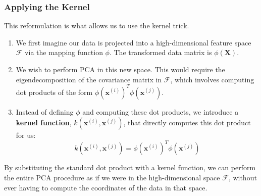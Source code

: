 \begin{enumerate}
\subsubsection*{Applying the Kernel}
This reformulation is what allows us to use the kernel trick.
\begin{enumerate}
    \item We first imagine our data is projected into a high-dimensional feature space $\mathcal{F}$ via the mapping function $\phi$. The transformed data matrix is $\phi(\mathbf{X})$.
    \item We wish to perform PCA in this new space. This would require the eigendecomposition of the covariance matrix in $\mathcal{F}$, which involves computing dot products of the form $\phi(\mathbf{x}^{(i)})^T \phi(\mathbf{x}^{(j)})$.
    \item Instead of defining $\phi$ and computing these dot products, we introduce a \textbf{kernel function}, $k(\mathbf{x}^{(i)}, \mathbf{x}^{(j)})$, that directly computes this dot product for us:
    $$ k(\mathbf{x}^{(i)}, \mathbf{x}^{(j)}) = \phi(\mathbf{x}^{(i)})^T \phi(\mathbf{x}^{(j)}) $$
\end{enumerate}
By substituting the standard dot product with a kernel function, we can perform the entire PCA procedure as if we were in the high-dimensional space $\mathcal{F}$, without ever having to compute the coordinates of the data in that space.


\end{enumerate}
